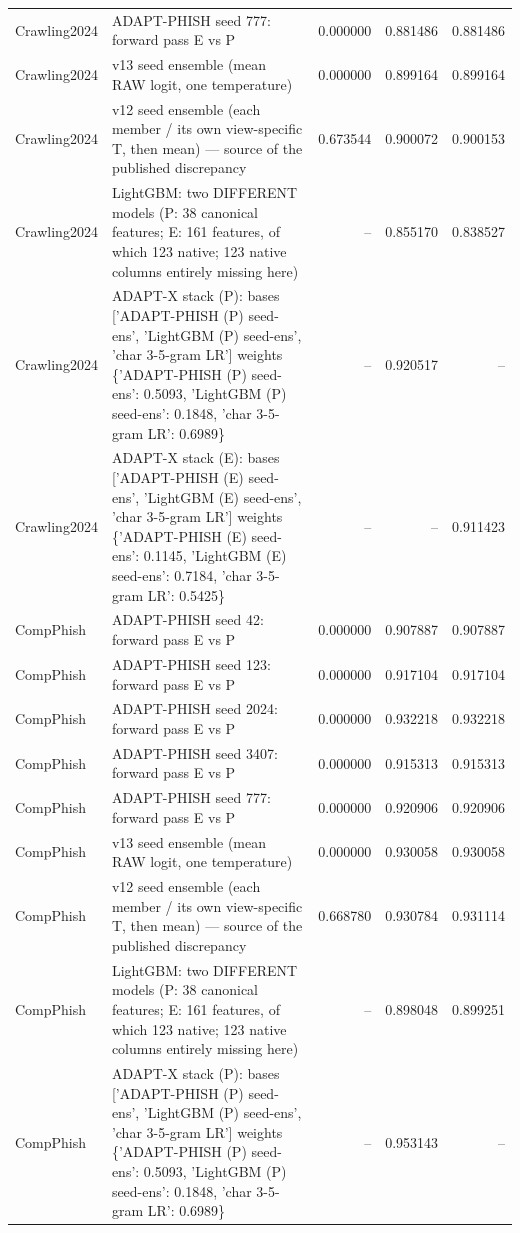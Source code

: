 \begin{table}[t]
\begin{tabular}{llrrr}
Crawling2024 & ADAPT-PHISH seed 777: forward pass E vs P & 0.000000 & 0.881486 & 0.881486 \\
Crawling2024 & v13 seed ensemble (mean RAW logit, one temperature) & 0.000000 & 0.899164 & 0.899164 \\
Crawling2024 & v12 seed ensemble (each member / its own view-specific T, then mean) — source of the published discrepancy & 0.673544 & 0.900072 & 0.900153 \\
Crawling2024 & LightGBM: two DIFFERENT models (P: 38 canonical features; E: 161 features, of which 123 native; 123 native columns entirely missing here) & -- & 0.855170 & 0.838527 \\
Crawling2024 & ADAPT-X stack (P): bases ['ADAPT-PHISH (P) seed-ens', 'LightGBM (P) seed-ens', 'char 3-5-gram LR'] weights \{'ADAPT-PHISH (P) seed-ens': 0.5093, 'LightGBM (P) seed-ens': 0.1848, 'char 3-5-gram LR': 0.6989\} & -- & 0.920517 & -- \\
Crawling2024 & ADAPT-X stack (E): bases ['ADAPT-PHISH (E) seed-ens', 'LightGBM (E) seed-ens', 'char 3-5-gram LR'] weights \{'ADAPT-PHISH (E) seed-ens': 0.1145, 'LightGBM (E) seed-ens': 0.7184, 'char 3-5-gram LR': 0.5425\} & -- & -- & 0.911423 \\
CompPhish & ADAPT-PHISH seed 42: forward pass E vs P & 0.000000 & 0.907887 & 0.907887 \\
CompPhish & ADAPT-PHISH seed 123: forward pass E vs P & 0.000000 & 0.917104 & 0.917104 \\
CompPhish & ADAPT-PHISH seed 2024: forward pass E vs P & 0.000000 & 0.932218 & 0.932218 \\
CompPhish & ADAPT-PHISH seed 3407: forward pass E vs P & 0.000000 & 0.915313 & 0.915313 \\
CompPhish & ADAPT-PHISH seed 777: forward pass E vs P & 0.000000 & 0.920906 & 0.920906 \\
CompPhish & v13 seed ensemble (mean RAW logit, one temperature) & 0.000000 & 0.930058 & 0.930058 \\
CompPhish & v12 seed ensemble (each member / its own view-specific T, then mean) — source of the published discrepancy & 0.668780 & 0.930784 & 0.931114 \\
CompPhish & LightGBM: two DIFFERENT models (P: 38 canonical features; E: 161 features, of which 123 native; 123 native columns entirely missing here) & -- & 0.898048 & 0.899251 \\
CompPhish & ADAPT-X stack (P): bases ['ADAPT-PHISH (P) seed-ens', 'LightGBM (P) seed-ens', 'char 3-5-gram LR'] weights \{'ADAPT-PHISH (P) seed-ens': 0.5093, 'LightGBM (P) seed-ens': 0.1848, 'char 3-5-gram LR': 0.6989\} & -- & 0.953143 & -- \\

\end{tabular}
\end{table}
